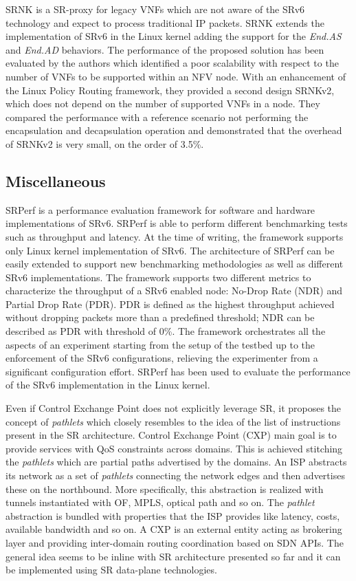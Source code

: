 SRNK \cite{mayer2019efficient} is a SR-proxy for legacy VNFs which are not aware of the SRv6 technology and expect to process traditional IP packets. SRNK extends the implementation of SRv6 in the Linux kernel \cite{lebrun2017implementing} adding the support for the \textit{End.AS} and \textit{End.AD} behaviors. The performance of the proposed solution has been evaluated by the authors which identified a poor scalability with respect to the number of VNFs to be supported within an NFV node. With an enhancement of the Linux Policy Routing framework, they provided a second design SRNKv2, which does not depend on the number of supported VNFs in a node. They compared the performance with a reference scenario not performing the encapsulation and decapsulation operation and demonstrated that the overhead of SRNKv2 is very small, on the order of 3.5\%.

\subsection{Miscellaneous}

SRPerf \cite{ahmedperformance} is a performance evaluation framework for software and hardware implementations of SRv6. SRPerf is able to perform different benchmarking tests such as throughput and latency. At the time of writing, the framework supports only Linux kernel implementation of SRv6. The architecture of SRPerf can be easily extended to support new benchmarking methodologies as well as different SRv6 implementations. The framework supports two different metrics to characterize the throughput of a SRv6 enabled node: No-Drop Rate (NDR) and Partial Drop Rate (PDR). PDR is defined as the highest throughput achieved without dropping packets more than a predefined threshold; NDR can be described as PDR with threshold of 0\%. The framework orchestrates all the aspects of an experiment starting from the setup of the testbed up to the enforcement of the SRv6 configurations, relieving the experimenter from a significant configuration effort. SRPerf has been used to evaluate the performance of the SRv6 implementation in the Linux kernel.

Even if Control Exchange Point \cite{cxp} does not explicitly leverage SR, it proposes the concept of \textit{pathlets} \cite{pathlet} which closely resembles to the idea of the list of instructions present in the SR architecture. Control Exchange Point (CXP) main goal is to provide services with QoS constraints across domains. This is achieved stitching the \textit{pathlets} which are partial paths advertised by the domains. An ISP abstracts its network as a set of \textit{pathlets} connecting the network edges and then advertises these on the northbound. More specifically, this abstraction is realized with tunnels instantiated with OF, MPLS, optical path and so on. The \textit{pathlet} abstraction is bundled with properties that the ISP provides like latency, costs, available bandwidth and so on. A CXP is an external entity acting as brokering layer and providing inter-domain routing coordination based on SDN APIs. The general idea seems to be inline with SR architecture presented so far and it can be implemented using SR data-plane technologies.

